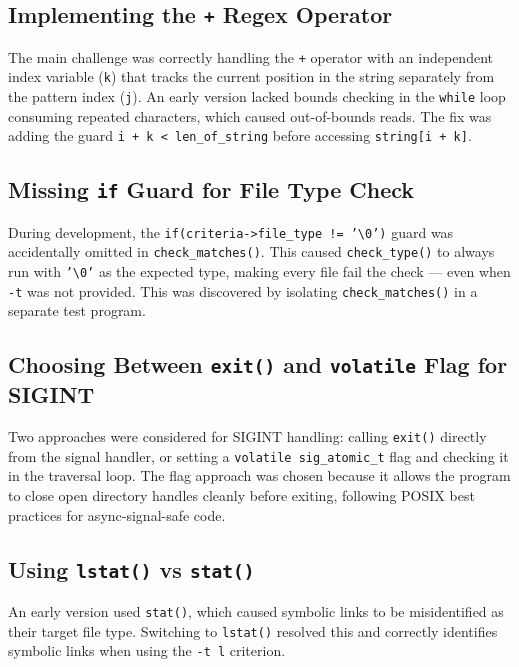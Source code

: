 \documentclass[12pt, a4paper]{article}
\begin{document}
\subsection{Implementing the \texttt{+} Regex Operator}

The main challenge was correctly handling the \texttt{+} operator with an independent
index variable (\texttt{k}) that tracks the current position in the string separately
from the pattern index (\texttt{j}). An early version lacked bounds checking in the
\texttt{while} loop consuming repeated characters, which caused out-of-bounds reads.
The fix was adding the guard \texttt{i + k < len\_of\_string} before accessing
\texttt{string[i + k]}.

\subsection{Missing \texttt{if} Guard for File Type Check}

During development, the \texttt{if(criteria->file\_type != '\textbackslash0')} guard was
accidentally omitted in \texttt{check\_matches()}. This caused \texttt{check\_type()} to
always run with \texttt{'\textbackslash0'} as the expected type, making every file fail the
check — even when \texttt{-t} was not provided. This was discovered by isolating
\texttt{check\_matches()} in a separate test program.

\subsection{Choosing Between \texttt{exit()} and \texttt{volatile} Flag for SIGINT}

Two approaches were considered for SIGINT handling: calling \texttt{exit()} directly from
the signal handler, or setting a \texttt{volatile sig\_atomic\_t} flag and checking it in
the traversal loop. The flag approach was chosen because it allows the program to close
open directory handles cleanly before exiting, following POSIX best practices for
async-signal-safe code.

\subsection{Using \texttt{lstat()} vs \texttt{stat()}}

An early version used \texttt{stat()}, which caused symbolic links to be misidentified
as their target file type. Switching to \texttt{lstat()} resolved this and correctly
identifies symbolic links when using the \texttt{-t l} criterion.
\end{document}
